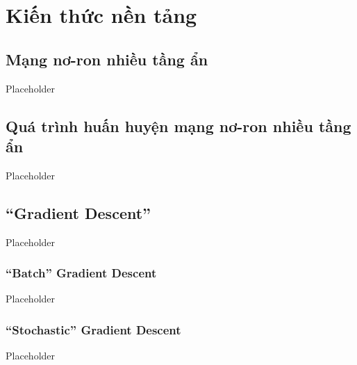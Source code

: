 \chapter{Kiến thức nền tảng}
\label{Chapter2}

\section{Mạng nơ-ron nhiều tầng ẩn}

Placeholder

\section{Quá trình huấn huyện mạng nơ-ron nhiều tầng ẩn}

Placeholder

\section{``Gradient Descent''}

Placeholder

\subsection{``Batch'' Gradient Descent}

Placeholder

\subsection{``Stochastic'' Gradient Descent}

Placeholder